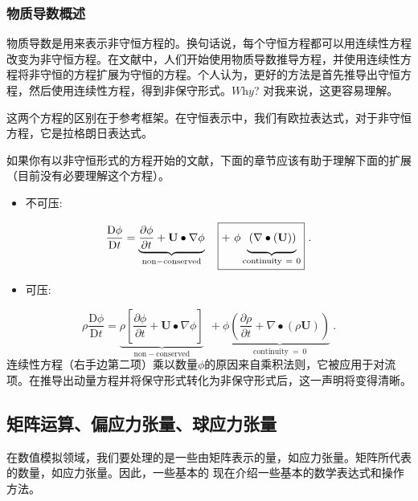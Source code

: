 \documentclass[LBMDerivation.tex]{subfiles}
\begin{document}
\subsubsection{物质导数概述}
%
%

	物质导数是用来表示非守恒方程的。换句话说，每个守恒方程都可以用连续性方程改变为非守恒方程。在文献中，人们开始使用物质导数推导方程，并使用连续性方程将非守恒的方程扩展为守恒的方程。个人认为，更好的方法是首先推导出守恒方程，然后使用连续性方程，得到非保守形式。$\textit{Why}$? 对我来说，这更容易理解。


	这两个方程的区别在于参考框架。在守恒表示中，我们有欧拉表达式，对于非守恒方程，它是拉格朗日表达式。


	如果你有以非守恒形式的方程开始的文献，下面的章节应该有助于理解下面的扩展（目前没有必要理解这个方程）。
%
%
\begin{itemize}
    \item 不可压:
\end{itemize}
%
%
\begin{equation}
    \frac{\mathrm{D}\phi}{\mathrm{D}t}
=
    \underbrace
    {
        \frac{\partial \phi}{\partial t}
      + \textbf{U}\bullet \nabla \phi
    }_{\mathrm{non-conserved}}
 ~~~
     \boxed
     { + ~
        \phi
        \underbrace
        {
            \vphantom{\frac{1}{2}}\left( \nabla \bullet (\textbf{U})\right)
        }_{\mathrm{continuity~=~0}}
     } ~.
\end{equation}
%
%
\begin{itemize}
    \item 可压:
\end{itemize}
%
%
\begin{equation}
   \rho \frac{\mathrm{D}\phi}{\mathrm{D}t}
=
    \underbrace
    {
        \rho\left[\frac{\partial \phi}{\partial t}
      + \textbf{U}\bullet \nabla \phi\right]
    }_{\mathrm{non-conserved}}
 ~~~
    \boxed
    { + ~
        \phi
        \underbrace
        {
            \left( \frac{\partial \rho}{\partial t}
          + \nabla \bullet (\rho \textbf{U})\right)
        }_{\mathrm{continuity~=~0}}
    } ~.
\end{equation}
%
%
	连续性方程（右手边第二项）乘以数量$\phi$的原因来自乘积法则，它被应用于对流项。在推导出动量方程并将保守形式转化为非保守形式后，这一声明将变得清晰。
%
%
%
%
\subsection{矩阵运算、偏应力张量、球应力张量}
%
%
	在数值模拟领域，我们要处理的是一些由矩阵表示的量，如应力张量。矩阵所代表的数量，如应力张量。因此，一些基本的 现在介绍一些基本的数学表达式和操作方法。
\end{document}
